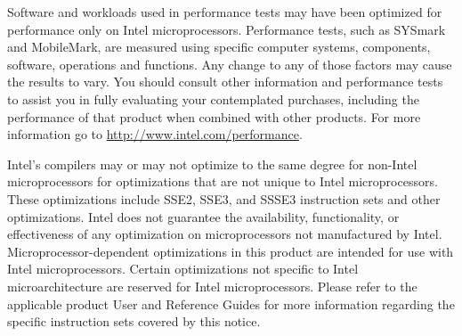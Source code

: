 
Software and workloads used in performance tests may have been
optimized for performance only on Intel microprocessors.  Performance
tests, such as SYSmark and MobileMark, are measured using specific
computer systems, components, software, operations and functions.  Any
change to any of those factors may cause the results to vary.  You
should consult other information and performance tests to assist you
in fully evaluating your contemplated purchases, including the
performance of that product when combined with other products.  For
more information go to \url{http://www.intel.com/performance}.

Intel's compilers may or may not optimize to the same degree for
non-Intel microprocessors for optimizations that are not unique to
Intel microprocessors. These optimizations include SSE2, SSE3, and
SSSE3 instruction sets and other optimizations. Intel does not
guarantee the availability, functionality, or effectiveness of any
optimization on microprocessors not manufactured by
Intel. Microprocessor-dependent optimizations in this product are
intended for use with Intel microprocessors. Certain optimizations not
specific to Intel microarchitecture are reserved for Intel
microprocessors. Please refer to the applicable product User and
Reference Guides for more information regarding the specific
instruction sets covered by this notice.
